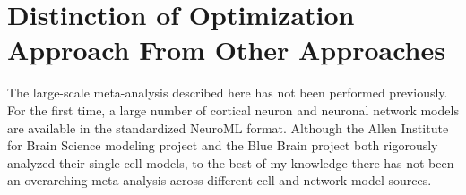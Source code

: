 








\section{Distinction of Optimization Approach From Other Approaches}
The large-scale meta-analysis described here has not been performed previously. For the first time, a large number of cortical neuron and neuronal network models are available in the standardized NeuroML format. Although the Allen Institute for Brain Science modeling project and the Blue Brain project both rigorously analyzed their single cell models, to the best of my knowledge there has not been an overarching meta-analysis across different cell and network model sources.\\


